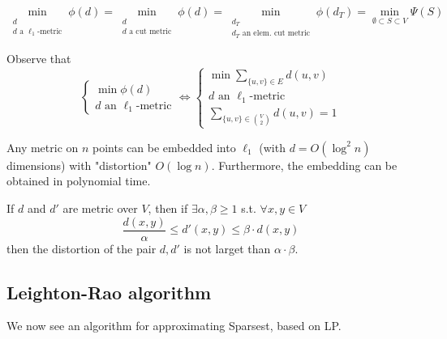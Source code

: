     \begin{corollary}
        \[ \min_{\substack{d\\ d \text{ a } \ell_1 \text{-metric}}} \phi(d) = \min_{\substack{d\\ d \text{  a cut metric}}} \phi(d) = \min_{\substack{d_T\\ d_T \text{ an elem. cut metric}}} \phi(d_T) = \min_{\emptyset \subset S \subset V} \Psi(S)  \]
    \end{corollary}

    Observe that
    \begin{equation}
        \begin{cases}
            \min \phi(d)\\
            d \text{ an } \ell_1 \text{-metric}
        \end{cases}
        \Longleftrightarrow
        \begin{cases}
            \min \sum_{\{u,v\} \in E} d(u,v)\\
            d \text{ an } \ell_1 \text{-metric}\\
            \sum_{\{u,v\} \in \binom{V}{2}} d(u,v) = 1
        \end{cases}
    \end{equation}

    \begin{theorem}
        Any metric on $n$ points can be embedded into $\ell_1$ (with $d = O(\log^2 n)$ dimensions) with "distortion" $O(\log n)$.
        Furthermore, the embedding can be obtained in polynomial time.
    \end{theorem}

    \begin{definition}[Distortion]
        If $d$ and $d'$ are metric over $V$, then if $\exists \alpha, \beta \geq 1$ s.t. $\forall x,y \in V$
        \[ \dfrac{d(x,y)}{\alpha} \leq d'(x,y) \leq \beta \cdot d(x,y) \]
        then the distortion of the pair $d,d'$ is not larget than $\alpha \cdot \beta$.
    \end{definition}


\subsection{Leighton-Rao algorithm}
    We now see an algorithm for approximating Sparsest, based on LP.

